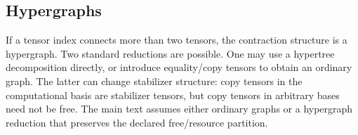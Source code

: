 \subsection{Hypergraphs}

If a tensor index connects more than two tensors, the contraction structure is a hypergraph. Two standard reductions are possible. One may use a hypertree decomposition directly, or introduce equality/copy tensors to obtain an ordinary graph. The latter can change stabilizer structure: copy tensors in the computational basis are stabilizer tensors, but copy tensors in arbitrary bases need not be free. The main text assumes either ordinary graphs or a hypergraph reduction that preserves the declared free/resource partition.
